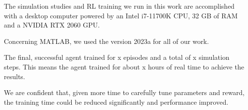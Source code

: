The simulation studies and RL training we run in this work are accomplished with a desktop computer powered by an Intel i7-11700K CPU, 32 GB of RAM and a NVIDIA RTX 2060 GPU.

Concerning MATLAB, we used the version 2023a for all of our work.


The final, successful agent trained for x episodes and a total of x simulation steps. 
This means the agent trained for about x hours of real time to achieve the results.

We are confident that, given more time to carefully tune parameters and reward, the training time could be reduced significantly and performance improved.

